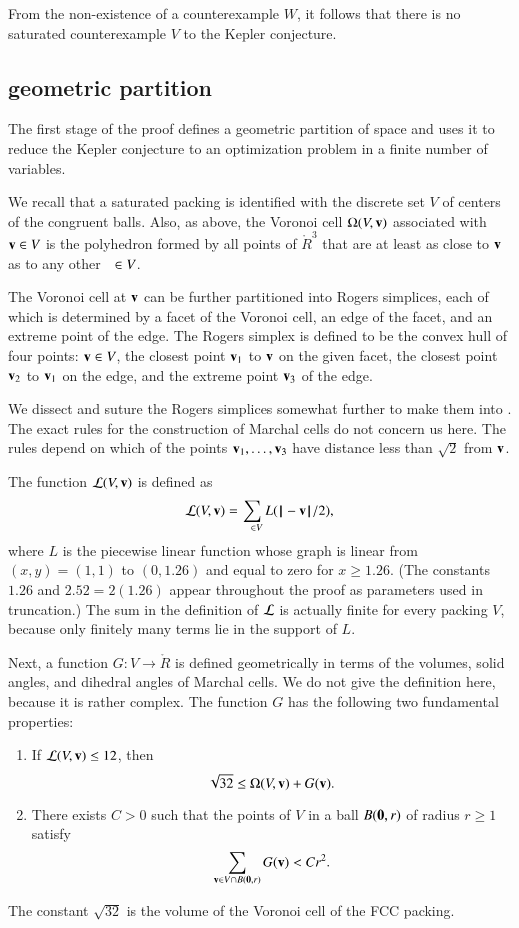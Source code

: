 From the non-existence of a counterexample $W$, 
it follows that there is no saturated
counterexample $V$ to the Kepler conjecture.



\subsection{geometric partition}

The first stage of the proof defines a geometric partition of space
and uses it to reduce the Kepler conjecture to an optimization problem
in a finite number of variables.

We recall that a saturated packing is
identified with the discrete set $V$ of centers of the
congruent balls.  Also, as above, the Voronoi cell $\Omega(V,{\mathbf v})$
associated with ${\mathbf v}\in V$ is the polyhedron formed by all points of
$\ring{R}^3$ that are at least as close to ${\mathbf v}$ as to any other $\hskip0.65em\in
V$.   

The Voronoi cell at ${\mathbf v}$ can be further partitioned into Rogers
simplices, each of which is determined by a facet of the Voronoi cell, an edge of
the facet, and an extreme point of the edge.  The Rogers simplex is defined to be the
convex hull of four points: ${\mathbf v}\in V$, the closest point ${\mathbf v}_1$ to ${\mathbf v}$ on the given facet, the closest point ${\mathbf v}_2$ to ${\mathbf v}_1$ on the edge, and the
extreme point ${\mathbf v}_3$ of the edge.


We dissect and suture the Rogers simplices somewhat further to make them into 
.  The exact rules for the construction of Marchal cells
do not concern us here.  The rules depend on which of the
points ${\mathbf v}_1,\ldots,{\mathbf v}_3$ have distance  less than $\sqrt2$ from
${\mathbf v}$.

The function
 ${\mathcal L}(V,{\mathbf v})$ is defined as
\begin{equation}\label{eqn:LV}
\CalL(V,\v) = \sum_{\w\in V} L(\norm{\w}{\v}/2),
\end{equation}
where $L$ is the piecewise linear function whose graph is linear from
$(x,y)=(1,1)$ to $(0,1.26)$ and equal to zero for $x\ge 1.26$.  (The
constants $1.26$ and $2.52=2(1.26)$ appear throughout the proof as
parameters used in truncation.)   
The sum in the definition of ${\mathcal L}$ is actually finite for every packing $V$, because only finitely many terms
lie in the support of $L$. 

Next, a function $G:V\to \ring{R}$ is defined geometrically in terms
of the volumes, solid angles, and dihedral angles of Marchal cells.
We do not give the definition here, because it is rather
complex.  The function $G$ has the following two fundamental
properties:
\begin{enumerate}
\item If ${\mathcal L}(V,{\mathbf v})\le 12$, then 
\[
\sqrt{32}\le \Omega(V,{\mathbf v}) +G({\mathbf v}).
\]
\item There exists $C>0$ such that the points of $V$ in a ball $B({\mathbf 0},r)$
of radius $r\ge 1$ satisfy
\[
\sum_{{\mathbf v}\in V \cap B({\mathbf 0},r)} G({\mathbf v}) < C r^2.
\]
\end{enumerate}
The constant $\sqrt{32}$ is the volume of the Voronoi cell of the FCC packing.

